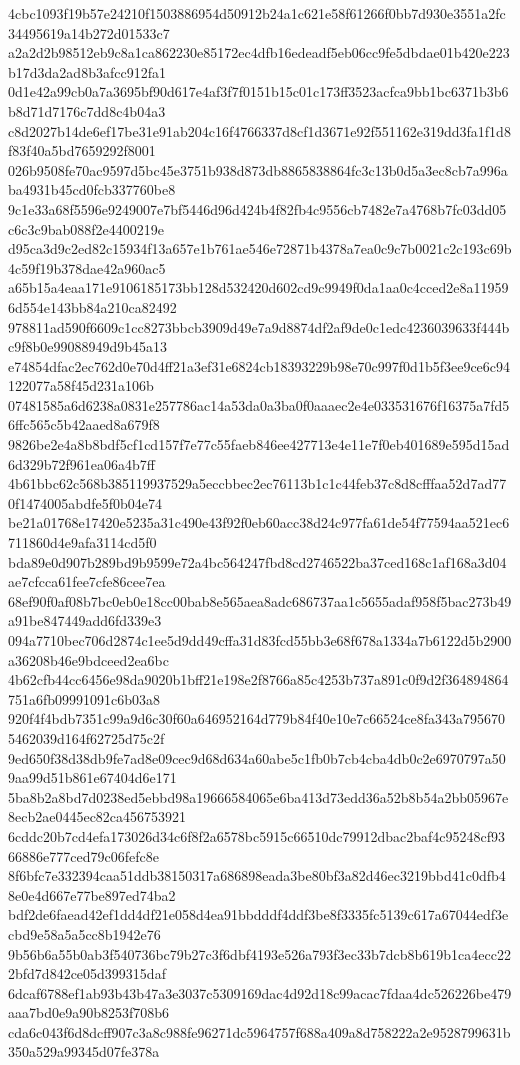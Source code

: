 {4cbc1093f19b57e24210f1503886954d50912b24a1c621e58f61266f0bb7d930e3551a2fc34495619a14b272d01533c7
a2a2d2b98512eb9c8a1ca862230e85172ec4dfb16edeadf5eb06cc9fe5dbdae01b420e223b17d3da2ad8b3afcc912fa1
0d1e42a99cb0a7a3695bf90d617e4af3f7f0151b15c01c173ff3523acfca9bb1bc6371b3b6b8d71d7176c7dd8c4b04a3
c8d2027b14de6ef17be31e91ab204c16f4766337d8cf1d3671e92f551162e319dd3fa1f1d8f83f40a5bd7659292f8001
026b9508fe70ac9597d5bc45e3751b938d873db8865838864fc3c13b0d5a3ec8cb7a996aba4931b45cd0fcb337760be8
9c1e33a68f5596e9249007e7bf5446d96d424b4f82fb4c9556cb7482e7a4768b7fc03dd05c6c3c9bab088f2e4400219e
d95ca3d9c2ed82c15934f13a657e1b761ae546e72871b4378a7ea0c9c7b0021c2c193c69b4c59f19b378dae42a960ac5
a65b15a4eaa171e9106185173bb128d532420d602cd9c9949f0da1aa0c4cced2e8a119596d554e143bb84a210ca82492
978811ad590f6609c1cc8273bbcb3909d49e7a9d8874df2af9de0c1edc4236039633f444bc9f8b0e99088949d9b45a13
e74854dfac2ec762d0e70d4ff21a3ef31e6824cb18393229b98e70c997f0d1b5f3ee9ce6c94122077a58f45d231a106b
07481585a6d6238a0831e257786ac14a53da0a3ba0f0aaaec2e4e033531676f16375a7fd56ffc565c5b42aaed8a679f8
9826be2e4a8b8bdf5cf1cd157f7e77c55faeb846ee427713e4e11e7f0eb401689e595d15ad6d329b72f961ea06a4b7ff
4b61bbc62c568b385119937529a5eccbbec2ec76113b1c1c44feb37c8d8cfffaa52d7ad770f1474005abdfe5f0b04e74
be21a01768e17420e5235a31c490e43f92f0eb60acc38d24c977fa61de54f77594aa521ec6711860d4e9afa3114cd5f0
bda89e0d907b289bd9b9599e72a4bc564247fbd8cd2746522ba37ced168c1af168a3d04ae7cfcca61fee7cfe86cee7ea
68ef90f0af08b7bc0eb0e18cc00bab8e565aea8adc686737aa1c5655adaf958f5bac273b49a91be847449add6fd339e3
094a7710bec706d2874c1ee5d9dd49cffa31d83fcd55bb3e68f678a1334a7b6122d5b2900a36208b46e9bdceed2ea6bc
4b62cfb44cc6456e98da9020b1bff21e198e2f8766a85c4253b737a891c0f9d2f364894864751a6fb09991091c6b03a8
920f4f4bdb7351c99a9d6c30f60a646952164d779b84f40e10e7c66524ce8fa343a7956705462039d164f62725d75c2f
9ed650f38d38db9fe7ad8e09cec9d68d634a60abe5c1fb0b7cb4cba4db0c2e6970797a509aa99d51b861e67404d6e171
5ba8b2a8bd7d0238ed5ebbd98a19666584065e6ba413d73edd36a52b8b54a2bb05967e8ecb2ae0445ec82ca456753921
6cddc20b7cd4efa173026d34c6f8f2a6578bc5915c66510dc79912dbac2baf4c95248cf9366886e777ced79c06fefc8e
8f6bfc7e332394caa51ddb38150317a686898eada3be80bf3a82d46ec3219bbd41c0dfb48e0e4d667e77be897ed74ba2
bdf2de6faead42ef1dd4df21e058d4ea91bbdddf4ddf3be8f3335fc5139c617a67044edf3ecbd9e58a5a5cc8b1942e76
9b56b6a55b0ab3f540736bc79b27c3f6dbf4193e526a793f3ec33b7dcb8b619b1ca4ecc222bfd7d842ce05d399315daf
6dcaf6788ef1ab93b43b47a3e3037c5309169dac4d92d18c99acac7fdaa4dc526226be479aaa7bd0e9a90b8253f708b6
cda6c043f6d8dcff907c3a8c988fe96271dc5964757f688a409a8d758222a2e9528799631b350a529a99345d07fe378a
}
